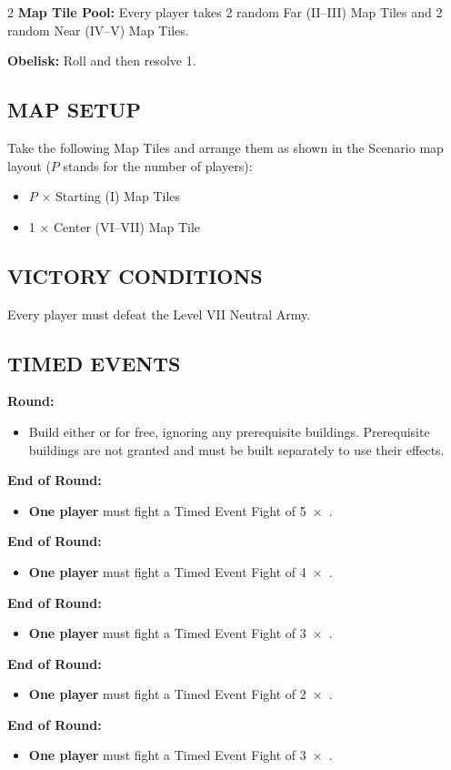 \begin{multicols}{2}
\textbf{Map Tile Pool:} Every player takes 2 random Far (II--III) Map Tiles and 2 random Near (IV--V) Map Tiles.

\textbf{Obelisk:} Roll  and  then resolve 1.

\subsection*{\MakeUppercase{Map Setup}}
Take the following Map Tiles and arrange them as shown in the Scenario map layout ($P$ stands for the number of players):

\begin{itemize}
  \item $P$ × Starting (I) Map Tiles
  \item 1 × Center (VI–VII) Map Tile
\end{itemize}

\subsection*{\MakeUppercase{Victory Conditions}}
Every player must defeat the Level VII Neutral Army.

\subsection*{\MakeUppercase{Timed Events}}
\textbf{ Round:}
\begin{itemize}
  \item Build either  or  for free, ignoring any prerequisite buildings.
    Prerequisite buildings are not granted and must be built separately to use their effects.
\end{itemize}
\textbf{End of  Round:}
\begin{itemize}
  \item \textbf{One player} must fight a Timed Event Fight of 5~×~.
\end{itemize}
\textbf{End of  Round:}
\begin{itemize}
  \item \textbf{One player} must fight a Timed Event Fight of 4~×~.
\end{itemize}
\textbf{End of  Round:}
\begin{itemize}
  \item \textbf{One player} must fight a Timed Event Fight of 3~×~.
\end{itemize}
\textbf{End of  Round:}
\begin{itemize}
  \item \textbf{One player} must fight a Timed Event Fight of 2~×~.
\end{itemize}
\textbf{End of  Round:}
\begin{itemize}
  \item \textbf{One player} must fight a Timed Event Fight of 3~×~.
\end{itemize}
\clearpage


\end{multicols}
